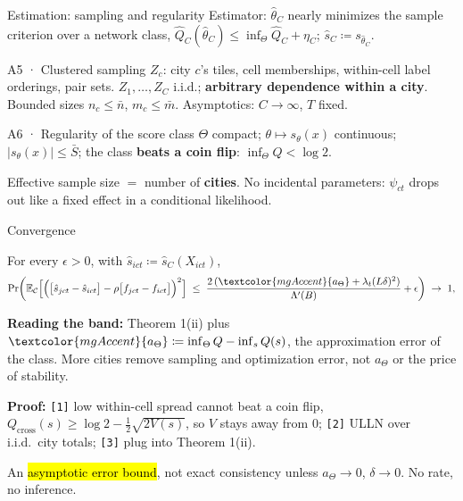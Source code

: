 \documentclass[10pt,aspectratio=169]{beamer}
\newcommand{\E}{\mathbb{E}}
\newcommand{\Cset}{\mathcal{C}}
\newcommand{\Qc}{Q_{\mathrm{cross}}}
\begin{document}
\begin{frame}{Estimation: sampling and regularity}
\small Estimator: $\hat\theta_C$ nearly minimizes the sample criterion over a network class, $\hat Q_C(\hat\theta_C)\le\inf_\Theta\hat Q_C+\eta_C$;\; $\hat s_C\coloneqq s_{\hat\theta_C}$.

\begin{tbox}[blue]{A5 · Clustered sampling}
\footnotesize $Z_c$: city $c$'s tiles, cell memberships, within-cell label orderings, pair sets. $Z_1,\dots,Z_C$ i.i.d.;
\textbf{arbitrary dependence within a city}. Bounded sizes $n_c\le\bar n$, $m_c\le\bar m$. Asymptotics: $C\to\infty$, $T$ fixed.
\end{tbox}
\begin{tbox}[blue]{A6 · Regularity of the score class}
\footnotesize $\Theta$ compact; $\theta\mapsto s_\theta(x)$ continuous; $|s_\theta(x)|\le\bar S$; the class \textbf{beats a coin flip}: $\inf_\Theta Q<\log 2$.
\end{tbox}
\footnotesize Effective sample size $=$ number of \textbf{cities}. No incidental parameters: $\psi_{ct}$ drops out like a fixed effect in a conditional likelihood.
\end{frame}

\begin{frame}{Convergence}
\begin{resultbox}[Theorem 2 · A1–A6, $\eta_C\to_p0$, $\mathrm{diam}(H)=D$, $B=\max\{2\bar S,\rho LD\}$]
For every $\epsilon>0$, with $\hat s_{ict}\coloneqq\hat s_C(X_{ict})$,
\[
  \Pr\!\left(\E_{\Cset}\Big[\Big(\big[\hat s_{jct}-\hat s_{ict}\big]-\rho\big[f_{jct}-f_{ict}\big]\Big)^2\Big] \;\le\; \frac{2\,(\textcolor{mgAccent}{a_\Theta}+\lambda_t(L\delta)^2)}{\Lambda'(B)}+\epsilon\right)\;\to\;1,
\]
\end{resultbox}
\footnotesize
\textbf{Reading the band:} Theorem 1(ii) plus $\textcolor{mgAccent}{a_\Theta}\coloneqq\inf_\Theta Q-\inf_s Q(s)$, the approximation error of the class. More cities remove sampling and optimization error, not $a_\Theta$ or the price of stability.

\textbf{Proof:} \texttt{[1]} low within-cell spread cannot beat a coin flip, $\Qc(s)\ge\log2-\tfrac12\sqrt{2V(s)}$, so $V$ stays away from 0; \texttt{[2]} ULLN over i.i.d.\ city totals; \texttt{[3]} plug into Theorem 1(ii).

An \hl{asymptotic error bound}, not exact consistency unless $a_\Theta\to0$, $\delta\to0$. No rate, no inference.
\end{frame}
\end{document}
